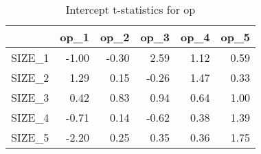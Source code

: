 \begin{table}[ht]
\centering
\caption{Intercept t-statistics for op} 
\begin{tabular}{rrrrrr}
  \hline
 & op\_1 & op\_2 & op\_3 & op\_4 & op\_5 \\ 
  \hline
SIZE\_1 & -1.00 & -0.30 & 2.59 & 1.12 & 0.59 \\ 
  SIZE\_2 & 1.29 & 0.15 & -0.26 & 1.47 & 0.33 \\ 
  SIZE\_3 & 0.42 & 0.83 & 0.94 & 0.64 & 1.00 \\ 
  SIZE\_4 & -0.71 & 0.14 & -0.62 & 0.38 & 1.39 \\ 
  SIZE\_5 & -2.20 & 0.25 & 0.35 & 0.36 & 1.75 \\ 
   \hline
\end{tabular}
\end{table}


